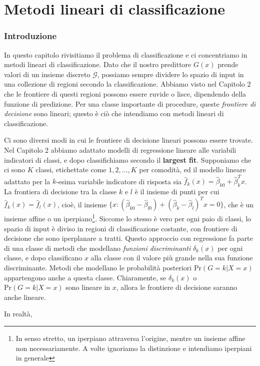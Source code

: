 \documentclass[11pt,openany]{book}
\begin{document}
\tableofcontents

\chapter{Metodi lineari di classificazione}

\subsection{Introduzione}

In questo capitolo rivisitiamo il problema di classificazione e ci concentriamo in metodi lineari di classificazione. Dato che il nostro predittore $G(x)$ prende valori di un insieme discreto $\mathcal{G}$, possiamo sempre dividere lo spazio di input in una collezione di regioni secondo la classificazione. Abbiamo visto nel Capitolo 2 che le frontiere di questi regioni possono essere ruvide o lisce, dipendendo della funzione di predizione. Per una classe importante di procedure, queste \textit{frontiere di decisione} sono lineari; questo è ciò che intendiamo con metodi lineari di classificazione.

Ci sono diversi modi in cui le frontiere di decisione lineari possono essere trovate. Nel Capitolo 2 abbiamo adattato modelli di regressione lineare alle variabili indicatori di classi, e dopo classifichiamo secondo il \textbf{largest fit}. Supponiamo che ci sono $K$ classi, etichettate come $1, 2, \dots, K$ per comodità, ed il modello lineare adattato per la $k$-esima variabile indicatore di risposta sia $\hat{f}_k(x) = \hat{\beta}_{k0} + \hat{\beta}_k^T x$. La frontiera di decisione tra la classe $k$ e $l$ è il insieme di punti per cui $\hat{f}_k (x) = \hat{f}_l (x)$, cioè, il insieme $\{ x : \left( \hat{\beta}_{k0} - \hat{\beta}_{l0} \right) + \left( \hat{\beta}_{k} - \hat{\beta}_{l} \right)^T x = 0 \}$, che è un insieme affine o un iperpiano\footnote{In senso stretto, un iperpiano attraversa l'origine, mentre un insieme affine non necessariamente. A volte ignoriamo la distinzione e intendiamo iperpiani in generale}. Siccome lo stesso è vero per ogni paio di classi, lo spazio di input è diviso in regioni di classificazione costante, con frontiere di decisione che sono iperplanare a tratti. Questo approccio con regressione fa parte di una classe di metodi che modellano \textit{funzioni discriminanti} $\delta_k (x)$ per ogni classe, e dopo classificano $x$ alla classe con il valore più grande nella sua funzione discriminante. Metodi che modellano le probabilità posteriori $\text{Pr}(G = k | X = x)$ appartengono anche a questa classe. Chiaramente, se $\delta_k (x)$ o $\text{Pr}(G = k | X = x)$ sono lineare in $x$, allora le frontiere di decisione saranno anche lineare.

In realtà, 

\end{document}
